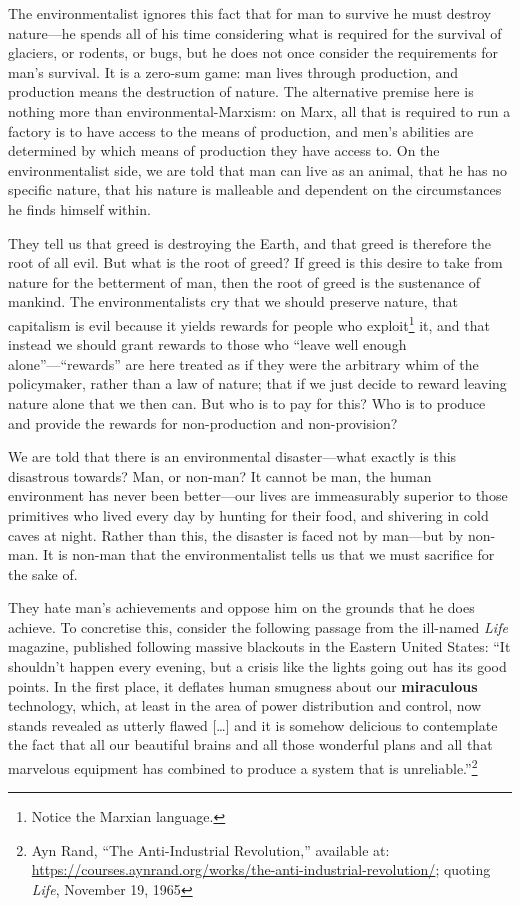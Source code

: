 \documentclass[11pt]{article}
\begin{document}
The environmentalist ignores this fact that for man to survive he must destroy nature---he spends all of his time considering what is required for the survival of glaciers, or rodents, or bugs, but he does not once consider the requirements for man's survival. It is a zero-sum game: man lives through production, and production means the destruction of nature. The alternative premise here is nothing more than environmental-Marxism: on Marx, all that is required to run a factory is to have access to the means of production, and men's abilities are determined by which means of production they have access to. On the environmentalist side, we are told that man can live as an animal, that he has no specific nature, that his nature is malleable and dependent on the circumstances he finds himself within.

They tell us that greed is destroying the Earth, and that greed is therefore the root of all evil. But what is the root of greed? If greed is this desire to take from nature for the betterment of man, then the root of greed is the sustenance of mankind. The environmentalists cry that we should preserve nature, that capitalism is evil because it yields rewards for people who exploit\footnote{Notice the Marxian language.} it, and that instead we should grant rewards to those who ``leave well enough alone''---``rewards'' are here treated as if they were the arbitrary whim of the policymaker, rather than a law of nature; that if we just decide to reward leaving nature alone that we then can. But who is to pay for this? Who is to produce and provide the rewards for non-production and non-provision?

We are told that there is an environmental disaster---what exactly is this disastrous towards? Man, or non-man? It cannot be man, the human environment has never been better---our lives are immeasurably superior to those primitives who lived every day by hunting for their food, and shivering in cold caves at night. Rather than this, the disaster is faced not by man---but by non-man. It is non-man that the environmentalist tells us that we must sacrifice for the sake of.

They hate man's achievements and oppose him on the grounds that he does achieve. To concretise this, consider the following passage from the ill-named \emph{Life} magazine, published following massive blackouts in the Eastern United States: ``It shouldn’t happen every evening, but a crisis like the lights going out has its good points. In the first place, it deflates human smugness about our \textbf{miraculous} technology, which, at least in the area of power distribution and control, now stands revealed as utterly flawed [\ldots{}] and it is somehow delicious to contemplate the fact that all our beautiful brains and all those wonderful plans and all that marvelous equipment has combined to produce a system that is unreliable.''\footnote{Ayn Rand, ``The Anti-Industrial Revolution,'' available at: \url{https://courses.aynrand.org/works/the-anti-industrial-revolution/}; quoting \emph{Life}, November 19, 1965}
\end{document}
